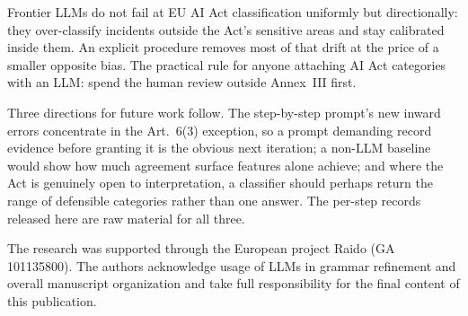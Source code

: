 \documentclass[sigconf,natbib=false, language=english]{acmart}
\begin{document}
Frontier LLMs do not fail at EU AI Act classification uniformly but directionally:
they over-classify incidents outside the Act's sensitive areas and stay calibrated
inside them. An explicit procedure removes most of that drift at the price of a
smaller opposite bias. The practical rule for anyone attaching AI Act categories with
an LLM: spend the human review outside Annex~III first.

Three directions for future work follow. The step-by-step prompt's new inward errors
concentrate in
the Art.~6(3) exception, so a prompt demanding record evidence before granting it is
the obvious next iteration; a non-LLM baseline would show how much agreement surface
features alone achieve; and where the Act is genuinely open to interpretation, a
classifier should perhaps return the range of defensible categories rather than one
answer. The per-step records released here are raw material for all three.

\begin{acks}
The research was supported through the European project Raido (GA 101135800). The authors acknowledge usage of LLMs in grammar refinement and overall manuscript organization and take full responsibility for the final content of this publication.
\end{acks}

\printbibliography
\end{document}
